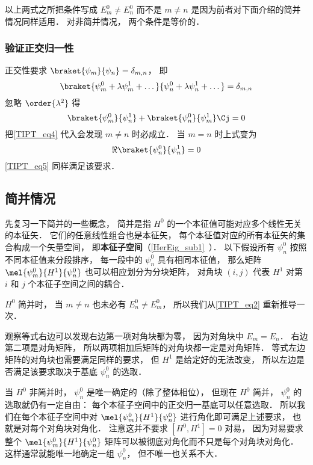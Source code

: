 以上两式之所把条件写成 $E_m^0 \ne E_n^0$ 而不是 $m \ne n$ 是因为前者对下面介绍的简并情况同样适用． 对非简并情况， 两个条件是等价的．

\subsubsection{验证正交归一性}
正交性要求 $\braket{\psi_m}{\psi_n} = \delta_{m,n}$， 即
\begin{equation}\label{TIPT_eq7}
\braket{\psi_m^0 + \lambda \psi_m^1 + \dots}{\psi_n^0 + \lambda \psi_n^1 + \dots} = \delta_{m,n}
\end{equation}
忽略 $\order{\lambda^2}$ 得
\begin{equation}\label{TIPT_eq8}
\braket{\psi_m^0}{\psi_n^1} + \braket{\psi_n^0}{\psi_m^1}\Cj = 0
\end{equation}
把\autoref{TIPT_eq4} 代入会发现 $m \ne n$ 时必成立． 当 $m = n$ 时上式变为
\begin{equation}
\Re{\braket{\psi_n^0}{\psi_n^1}} = 0
\end{equation}
\autoref{TIPT_eq5} 同样满足该要求．

\subsection{简并情况}
先复习一下简并的一些概念， 简并是指 $H^0$ 的一个本征值可能对应多个线性无关的本征矢． 它们的任意线性组合也是本征矢， 每个本征值对应的所有本征矢的集合构成一个矢量空间， 即\textbf{本征子空间}（\autoref{HerEig_sub1}~）． 以下假设所有 $\psi_n^0$ 按照不同本征值来分段排序， 每一段中的 $\psi_n^0$ 具有相同本征值， 那么矩阵 $\mel{\psi_m^0}{H^1}{\psi_n^0}$ 也可以相应划分为分块矩阵， 对角块 $(i,j)$ 代表 $H^1$ 对第 $i$ 和 $j$ 个本征子空间之间的耦合．

$H^0$ 简并时， 当 $m\ne n$ 也未必有 $E_n^0 \ne E_m^0$， 所以我们从\autoref{TIPT_eq2} 重新推导一次．

观察等式右边可以发现右边第一项对角块都为零， 因为对角块中 $E_m = E_n$． 右边第二项是对角矩阵， 所以两项相加后矩阵的对角块都一定是对角矩阵． 等式左边矩阵的对角块也需要满足同样的要求， 但 $H^1$ 是给定好的无法改变， 所以左边是否满足该要求取决于基底 $\psi_n^0$ 的选取．

当 $H^0$ 非简并时， $\psi_n^0$ 是唯一确定的（除了整体相位）， 但现在 $H^0$ 简并， $\psi_n^0$ 的选取就仍有一定自由： 每个本征子空间中的正交归一基底可以任意选取． 所以我们在每个本征子空间中对 $\mel{\psi_m^0}{H^1}{\psi_n^0}$ 进行角化即可满足上述要求， 也就是对每个对角块对角化． 注意这并不要求 $[H^0, H^1] = 0$ 对易， 因为对易要求整个 $\mel{\psi_m^0}{H^1}{\psi_n^0}$ 矩阵可以被彻底对角化而不只是每个对角块对角化． 这样通常就能唯一地确定一组 $\psi_n^0$， 但不唯一也关系不大．

